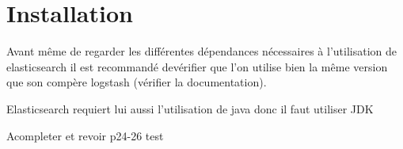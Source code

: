 \section{Installation}
Avant même de regarder les différentes dépendances nécessaires à l'utilisation de
elasticsearch il est recommandé devérifier que l'on utilise bien la même version
que son compère logstash (vérifier la documentation).

Elasticsearch requiert lui aussi l'utilisation de java donc il faut utiliser JDK

Acompleter et revoir
p24-26
 test
